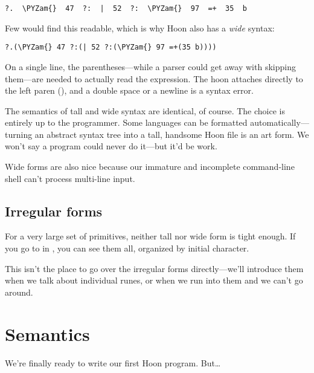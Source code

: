 \begin{framed_shaded}
\begin{Verbatim}[fontsize=\relsize{-2.5},fontseries=b,commandchars=\\\{\}]
?.  \PYZam{}  47  ?:  |  52  ?:  \PYZam{}  97  =+  35  b
\end{Verbatim}
\end{framed_shaded}
Few would find this readable, which is why Hoon also has a \emph{wide}
syntax:

\begin{framed_shaded}
\begin{Verbatim}[fontsize=\relsize{-2.5},fontseries=b,commandchars=\\\{\}]
?.(\PYZam{} 47 ?:(| 52 ?:(\PYZam{} 97 =+(35 b))))
\end{Verbatim}
\end{framed_shaded}
On a single line, the parentheses---while a parser could get away
with skipping them---are needed to actually read the expression.
The hoon attaches directly to the left paren (), and a
double space or a newline is a syntax error.

The semantics of tall and wide syntax are identical, of course.
The choice is entirely up to the programmer.  Some languages can
be formatted automatically---turning an abstract syntax tree into
a tall, handsome Hoon file is an art form.  We won't say a
program could never do it---but it'd be work.

Wide forms are also nice because our immature and incomplete
command-line shell can't process multi-line input.

\subsection{Irregular forms}

For a very large set of primitives, neither tall nor wide form is
tight enough.  If you go to  in , you can see
them all, organized by initial character.

This isn't the place to go over the irregular forms directly---we'll introduce them when we talk about individual runes, or
when we run into them and we can't go around.

\section{Semantics}

We're finally ready to write our first Hoon program.  But\ldots{}

